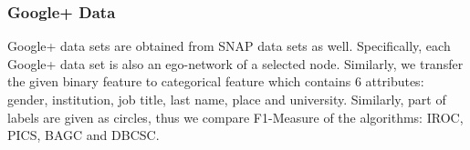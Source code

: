 \newpage
\subsubsection{Google+ Data}
Google+ data sets are obtained from SNAP data sets \cite{DBLP:conf/nips/McAuleyL12} as well. Specifically, each Google+ data set is also an ego-network of a selected node. Similarly, we transfer the given binary feature to categorical feature which contains $6$ attributes: gender, institution, job title, last name, place and university. Similarly, part of labels are given as circles, thus we compare F1-Measure of the algorithms: IROC, PICS, BAGC and DBCSC. 

